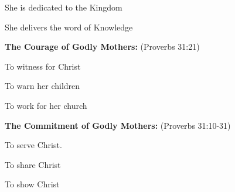 \begin{compactenum}[I.]
\begin{compactenum}[A.]
        \item She is dedicated to the Kingdom
        \item She delivers the word of Knowledge
    \end{compactenum}
    \item \textbf{The Courage of Godly Mothers:}  (Proverbs 31:21)
    \begin{compactenum}[A.]
        \item To witness for Christ 
        \item To warn her children 
        \item To work for her church
    \end{compactenum}
    \item \textbf{The Commitment of Godly Mothers:}  (Proverbs 31:10-31)
    \begin{compactenum}[A.]
        \item To serve Christ.
        \item To share Christ 
        \item To show Christ
    \end{compactenum}
\end{compactenum}

